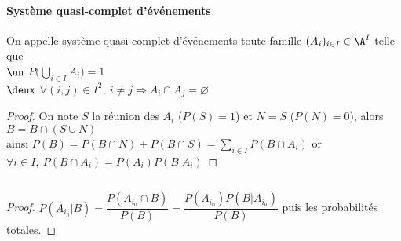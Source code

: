 		\paragraph{Système quasi-complet d'événements}
			On appelle \uline{système quasi-complet d'événements} toute famille $(A_i)_{i\in I} \in\A^I$ telle que \\
			\hspace*{2.5cm} $\un$ $P\Big( \bigcup\limits_{i\in I} A_i \Big) = 1$ \\
			\hspace*{2.5cm} $\deux$ $\forall (i,j)\in I^2 ,~ i\neq j \Rightarrow A_i\cap A_j = \varnothing$ \trait
		\begin{proof}
		On note $S$ la réunion des $A_i$ ($P(S)=1$) et $N=\overline{S}$ ($P(N)=0$), alors $B=B\cap (S\cup N)$ \\
		ainsi $P(B) = P(B\cap N) + P(B\cap S) = \sum_{i\in I} P(B\cap A_i)$ or $\forall i\in I, ~P(B\cap A_i) = P(A_i)P(B\vert A_i)$
		\end{proof}
		${}$ \\
		\begin{proof}
		$P(A_{i_0}\vert B) = \dfrac{P(A_{i_0} \cap B)}{P(B)} = \dfrac{P(A_{i_0})P(B\vert A_{i_0})}{P(B)}$ puis les probabilités totales.
		\end{proof} ${}$ \\ 
		\begin{center}
		\fin
		\end{center}